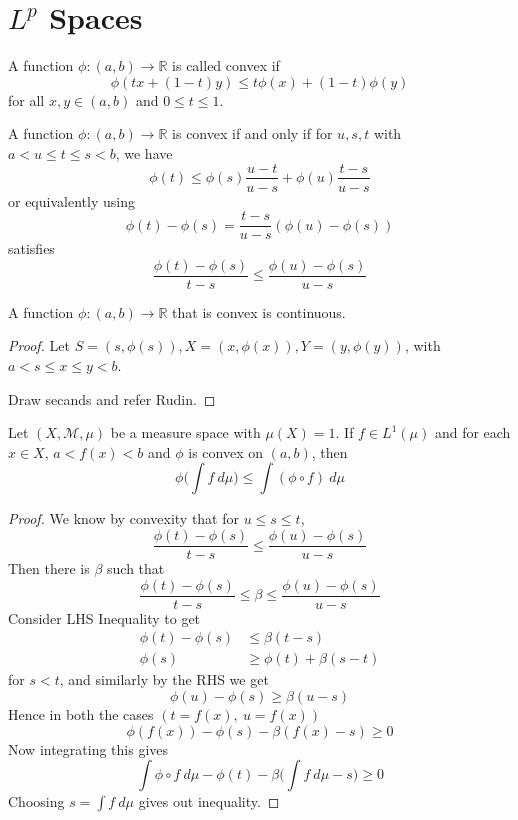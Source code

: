 
\chapter{$L^{p}$ Spaces}

\begin{definition}
  A function $\phi: (a,  b) \to \mathbb{R}$ is called convex if
  $$\phi(tx + (1-t)y) \le t \phi(x) + (1-t) \phi(y)$$
  for all $x, y \in
  (a, b)$ and $0 \le t \le 1$.
\end{definition}

\begin{proposition}
  A function $\phi: (a, b) \to \mathbb{R}$ is convex if and only if
  for $u, s, t$ with $ a < u \le t \le s < b$, we have \[
    \phi(t) \le \phi(s) \frac{u-t}{u-s} + \phi(u) \frac{t-s}{u-s}
  \]
  or equivalently using \[
    \phi(t) - \phi(s) = \frac{t-s}{u-s} (\phi(u) - \phi(s))
  \]
  satisfies \[
    \frac{\phi(t)-\phi(s)}{t-s} \le \frac{\phi(u)-\phi(s)}{u-s}
  \]
\end{proposition}

\begin{theorem}
  A function $\phi: (a, b) \to \mathbb{R}$ that is convex is continuous.
\end{theorem}
\begin{proof}
  Let $S = (s, \phi(s)), X = (  x, \phi(x)), Y = (y, \phi(y))$, with
  $a < s \le x \le y < b$.

  Draw secands and refer Rudin.
\end{proof}

\begin{theorem}
  Let $(X, \mathcal{M}, \mu)$ be a measure space with $\mu(X) = 1$.
  If $f \in L^1(\mu)$ and for each $x \in X$, $a < f(x)< b$ and $
  \phi$ is convex on $(a, b)$, then \[
    \phi \Bigg(\int  f \ d \mu \Bigg) \le \int (\phi \circ f)\ d \mu
  \]
\end{theorem}
\begin{proof}
  We know by convexity that for $u \le s \le t$, \[
    \frac{\phi(t)-\phi(s)}{t-s} \le \frac{\phi(u)-\phi(s)}{u-s}
  \]
  Then there is $\beta$ such that \[
    \frac{\phi(t)-\phi(s)}{t-s} \le \beta \le \frac{\phi(u)-\phi(s)}{u-s}
  \]
  Consider LHS Inequality to get
  \begin{align*}
    \phi(t) - \phi(s) & \le \beta (t-s) \\
    \phi(s) & \ge \phi(t) + \beta(s-t)
  \end{align*}
  for $s < t$, and similarly by the RHS we get\[
    \phi(u)-\phi(s) \ge \beta(u-s)
  \]
  Hence in both the cases $(t = f(x), \ u = f(x))$ \[
    \phi(f(x)) - \phi(s) - \beta(f(x) - s) \ge 0
  \]
  Now integrating this gives \[
    \int \phi \circ f\ d \mu - \phi(t) - \beta \Big( \int  f \ d \mu -
    s \Big) \ge 0
  \]
  Choosing $s = \int  f \ d \mu$ gives out inequality.
\end{proof}

